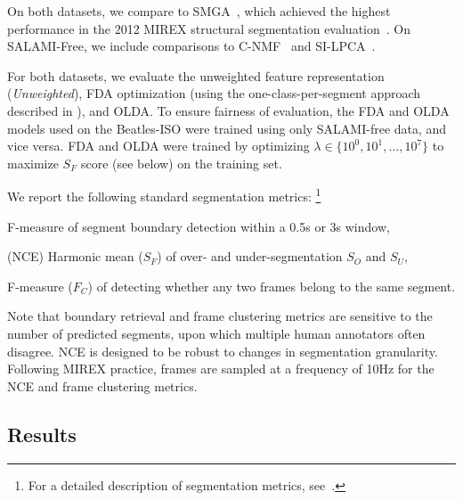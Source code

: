 \documentclass{article}
\begin{document}
On both datasets, we compare to SMGA~\cite{serra2012unsupervised}, which achieved the
highest performance in the 2012 MIREX structural segmentation evaluation~\cite{Downie2008}.
On SALAMI-Free, we include comparisons to C-NMF~\cite{nieto2013convex} and SI-LPCA~\cite{weiss2011unsupervised}.

For both datasets, we evaluate the unweighted feature representation (\emph{Unweighted}), FDA optimization (using the
one-class-per-segment approach described in ), and OLDA.\@
To ensure fairness of evaluation, the FDA and OLDA models used on the Beatles-ISO were trained using only
SALAMI-free data, and vice versa.  FDA and OLDA were trained by optimizing $\lambda \in \{10^0, 10^1, \dots, 10^7\}$
to maximize $S_F$ score (see below) on the training set.

We report the following standard segmentation metrics:
\footnote{For a detailed description of segmentation metrics, see~\cite{mirexstructure}.}
\begin{description}\addtolength{\itemsep}{-0.25\baselineskip}%
\item[Boundary retrieval] F-measure of segment boundary detection within a 0.5s or 3s window,
\item[Normalized conditional entropy] (NCE) Harmonic mean ($S_F$) of over- and under-segmentation $S_O$ and $S_U$, 
\item[Frame clustering] F-measure ($F_C$) of detecting whether any two frames belong to the same segment.
\end{description}
Note that boundary retrieval and frame clustering metrics are sensitive to the number of
predicted segments, upon which multiple human annotators often disagree.
NCE is designed to be robust to changes in segmentation granularity.
Following MIREX practice, frames are sampled at a frequency of 10Hz for the NCE and frame clustering metrics. 


\subsection{Results}
\label{sec:results}

\end{document}
